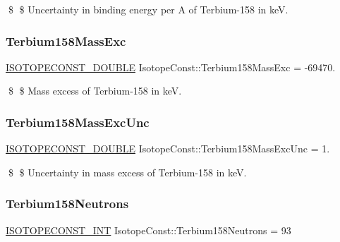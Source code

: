 \$ \$ Uncertainty in binding energy per A of Terbium-\/158 in keV. \mbox{\label{group___isotope_const-_terbium-_tb158_gaa6be3dab18a3c5d0de01f88f54be49cf}} 
\subsubsection{\texorpdfstring{Terbium158\+Mass\+Exc}{Terbium158MassExc}}
{\footnotesize\ttfamily \mbox{\hyperlink{group___isotope_const-_macros_ga8f45a7272ce02c0b4c65c44636ed719a}{I\+S\+O\+T\+O\+P\+E\+C\+O\+N\+S\+T\+\_\+\+D\+O\+U\+B\+LE}} Isotope\+Const\+::\+Terbium158\+Mass\+Exc = -\/69470.}

\$ \$ Mass excess of Terbium-\/158 in keV. \mbox{\label{group___isotope_const-_terbium-_tb158_ga27cd90676e5e0e01d36aa00a22d265bb}} 
\subsubsection{\texorpdfstring{Terbium158\+Mass\+Exc\+Unc}{Terbium158MassExcUnc}}
{\footnotesize\ttfamily \mbox{\hyperlink{group___isotope_const-_macros_ga8f45a7272ce02c0b4c65c44636ed719a}{I\+S\+O\+T\+O\+P\+E\+C\+O\+N\+S\+T\+\_\+\+D\+O\+U\+B\+LE}} Isotope\+Const\+::\+Terbium158\+Mass\+Exc\+Unc = 1.}

\$ \$ Uncertainty in mass excess of Terbium-\/158 in keV. \mbox{\label{group___isotope_const-_terbium-_tb158_ga0483b51a0d31c580725a180442251988}} 
\subsubsection{\texorpdfstring{Terbium158\+Neutrons}{Terbium158Neutrons}}
{\footnotesize\ttfamily \mbox{\hyperlink{group___isotope_const-_macros_ga5f18360b3e99483a35c32d789e62621c}{I\+S\+O\+T\+O\+P\+E\+C\+O\+N\+S\+T\+\_\+\+I\+NT}} Isotope\+Const\+::\+Terbium158\+Neutrons = 93}

